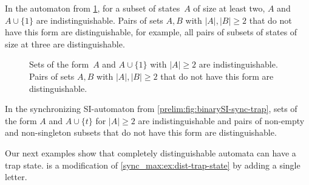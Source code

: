 \begin{example} \label{sync_max:ex:distinguishable-trap}
	In the automaton from \cref{sync_max:fig:example-trap-state},
	for a subset of states~$A$ of size at least two,
	$A$ and $A \cup \{1\}$ are indistinguishable.
	Pairs of sets $A,B$ with $|A|,|B| \ge 2$ that do not have this form are distinguishable,
	for example, all pairs of subsets of states of size at three are distinguishable.
				
	\begin{figure}[ht]
		\centering 
			\caption[Distinguishability in different classes of sets]{Sets of the 
				form~$A$ and $A \cup \{1\}$ with $|A| \ge 2$
				are indistinguishable. Pairs of sets $A,B$ with $|A|,|B| \ge 2$ that do not have this form are distinguishable.}
	\label{sync_max:fig:example-trap-state}
\end{figure}
\end{example}

\begin{example} \label{sync_max:ex:dist-trap-state}
	In the synchronizing SI-automaton from \cref{prelim:fig:binarySI-sync-trap},
	sets of the form $A$ and $A \cup \{t\}$ for $|A| \ge 2$ are indistinguishable
	and pairs of non-empty and non-singleton subsets that do not have this form
	are distinguishable.
\end{example}

Our next examples show that completely distinguishable automata can 
have a trap state.  is a modification
of \cref{sync_max:ex:dist-trap-state} by adding a single letter.

